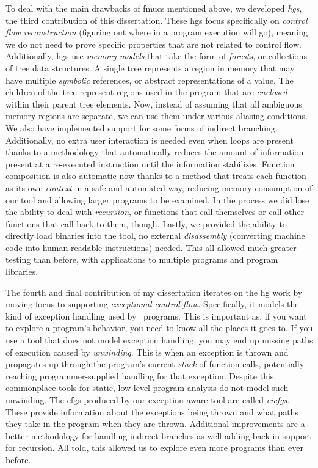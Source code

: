 {  To deal with the main drawbacks of \acp{fmuc} mentioned above, we developed \emph{\acfp{hg}}, the third contribution of this dissertation.
  These \acp{hg} focus specifically on \emph{control flow reconstruction} (figuring out where in a program execution will go), meaning we do not need to prove specific properties that are not related to control flow.
  Additionally, \acp{hg} use \emph{memory models} that take the form of \emph{forests}, or collections of tree data structures.
  A single tree represents a region in memory that may have multiple \emph{symbolic} references, or abstract representations of a value.
  The children of the tree represent regions used in the program that are \emph{enclosed} within their parent tree elements.
  Now, instead of assuming that all ambiguous memory regions are separate, we can use them under various aliasing conditions.
  We also have implemented support for some forms of indirect branching.
  Additionally, no extra user interaction is needed even when loops are present thanks to a methodology that automatically reduces the amount of information present at a re-executed instruction until the information stabilizes.
  Function composition is also automatic now thanks to a method that treats each function as its own \emph{context} in a safe and automated way, reducing memory consumption of our tool and allowing larger programs to be examined.
  In the process we did lose the ability to deal with \emph{recursion}, or functions that call themselves or call other functions that call back to them, though.
  Lastly, we provided the ability to directly load binaries into the tool, no external \emph{disassembly} (converting machine code into human-readable instructions) needed.
  This all allowed much greater testing than before, with applications to multiple programs and program libraries.

  The fourth and final contribution of my dissertation iterates on the \ac{hg} work by moving focus to supporting \emph{exceptional control flow}.
  Specifically, it models the kind of exception handling used by \Cpp\ programs.
  This is important as, if you want to explore a program's behavior, you need to know all the places it goes to.
  If you use a tool that does not model exception handling, you may end up missing paths of execution caused by \emph{unwinding}.
  This is when an exception is thrown and propagates up through the program's current \emph{stack} of function calls, potentially reaching programmer-supplied handling for that exception.
  Despite this, commonplace tools for static, low-level program analysis do not model such unwinding.
  The \acp{cfg} produced by our exception-aware tool are called \emph{\acfp{eicfg}}.
  These provide information about the exceptions being thrown and what paths they take in the program when they are thrown.
  Additional improvements are a better methodology for handling indirect branches as well adding back in support for recursion.
  All told, this allowed us to explore even more programs than ever before.
}
